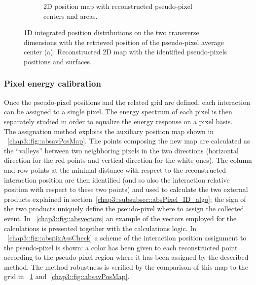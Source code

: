 \begin{figure}
\begin{subfigure}[t]{0.5\textwidth}
\caption{2D position map with reconstructed pseudo-pixel centers and areas.}
\label{chap3::fig::absfloodWithPix}
\end{subfigure}
\caption{1D integrated position distributions on the two transverse dimensions with the retrieved position of the pseudo-pixel average center (a). Reconstructed 2D map with the identified pseudo-pixels positions and surfaces.}
\label{chap3::fig::abspixID_analysis}
\end{figure}

\subsubsection{Pixel energy calibration}\label{chap3::subsubsec::absPixelEcal}

Once the pseudo-pixel positions and the related grid are defined, each interaction can be assigned to a single pixel. The energy spectrum of each pixel is then separately studied in order to equalize the energy response on a pixel basis.\\
The assignation method exploits the auxiliary position map shown in \figurename~\ref{chap3::fig::absavPosMap}. The points composing the new map are calculated as the \enquote{valleys} between two neighboring pixels in the two directions (horizontal direction for the red points and vertical direction for the white ones). The column and row points at the minimal distance with respect to the reconstructed interaction position are then identified (and so also the interaction relative position with respect to these two points) and used to calculate the two external products explained in section~\ref{chap3::subsubsec::absPixel_ID_algo}; the sign of the two products uniquely define the pseudo-pixel where to assign the collected event. In \figurename~\ref{chap3::fig::absvectors} an example of the vectors employed for the calculations is presented together with the calculations logic. In \figurename~\ref{chap3::fig::abspixAssCheck} a scheme of the interaction position assignment to the pseudo-pixel is shown: a color has been given to each reconstructed point according to the pseudo-pixel region where it has been assigned by the described method. The method robustness is verified by the comparison of this map to the grid in \figurename~\ref{chap3::fig::absfloodWithPix} and~\ref{chap3::fig::absavPosMap}.   

